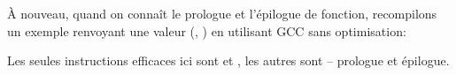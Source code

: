 
À nouveau, quand on connaît le prologue et l'épilogue de fonction, recompilons un
exemple renvoyant une valeur (, ) en
utilisant GCC sans optimisation:



Les seules instructions efficaces ici sont  et , les autres
sont -- prologue et épilogue.

